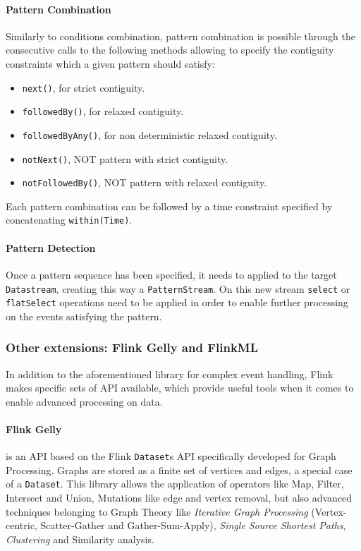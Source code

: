 \paragraph{Pattern Combination}

Similarly to conditions combination, pattern combination is possible through the consecutive calls to the following methods allowing to specify the contiguity constraints which a given pattern should satisfy:

\begin{itemize}
    
    \item \texttt{next()}, for strict contiguity.
    \item \texttt{followedBy()}, for relaxed contiguity.
    \item \texttt{followedByAny()}, for non deterministic relaxed contiguity.
    \item \texttt{notNext()}, NOT pattern with strict contiguity.
    \item \texttt{notFollowedBy()}, NOT pattern with relaxed contiguity.

\end{itemize}

Each pattern combination can be followed by a time constraint specified by concatenating \texttt{within(Time)}.

\paragraph{Pattern Detection}

Once a pattern sequence has been specified, it needs to applied to the target \texttt{Datastream}, creating this way a \texttt{PatternStream}.
On this new stream \texttt{select} or \texttt{flatSelect} operations need to be applied in order to enable further processing on the events satisfying the pattern.

\subsubsection{Other extensions: Flink Gelly and FlinkML}

In addition to the aforementioned library for complex event handling, Flink makes specific sets of API available, which provide useful tools when it comes to enable advanced processing on data.

\paragraph{Flink Gelly} is an API based on the Flink \texttt{Dataset}s API specifically developed for Graph Processing. Graphs are stored as a finite set of vertices and edges, a special case of a \texttt{Dataset}. This library allows the application of operators like Map, Filter, Intersect and Union, Mutations like edge and vertex removal, but also advanced techniques belonging to Graph Theory like \textit{Iterative Graph Processing} (Vertex-centric, Scatter-Gather and Gather-Sum-Apply), \textit{Single Source Shortest Paths}, \textit{Clustering} and Similarity analysis.

